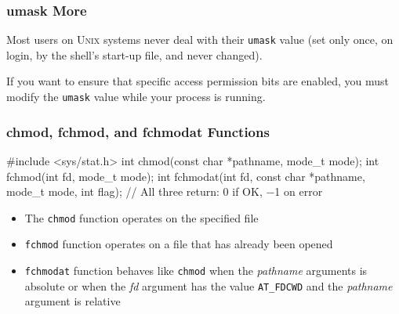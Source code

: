 \documentclass[newPxFont,sthlmFooter,nooffset]{beamer}
\begin{document}
\begin{frame}[t]
  \frametitle{umask More}
Most users on \textsc{Unix} systems never deal with their \texttt{umask} value (set only once, on login, by the shell's start-up file, and never changed). 
\bigskip

If you want to ensure that specific access permission bits are enabled, you must modify the \texttt{umask} value while your process is running. 

\end{frame}



\begin{frame}[containsverbatim,t]
    \frametitle{chmod, fchmod, and fchmodat Functions}
\begin{codedef}
#include <sys/stat.h>
int chmod(const char *pathname, mode_t mode);
int fchmod(int fd, mode_t mode);
int fchmodat(int fd, const char *pathname, mode_t mode, int flag);
// All three return: 0 if OK, −1 on error    
\end{codedef}
\bigskip

\begin{itemize}
\item The \texttt{chmod} function operates on the specified file
\item \texttt{fchmod} function operates on a file that has already been opened
\item \texttt{fchmodat} function behaves like \texttt{chmod} when the \textit{pathname}  arguments is absolute or when the \textit{fd} argument has the value \texttt{AT\_FDCWD} and the \textit{pathname} argument is relative
\end{itemize}
\end{frame}
\end{document}
